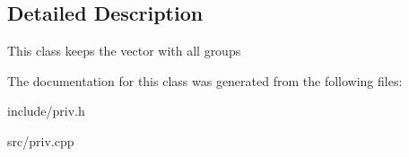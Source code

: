 \subsection{Detailed Description}
This class keeps the vector with all groups 

The documentation for this class was generated from the following files\+:\begin{DoxyCompactItemize}
\item 
include/priv.\+h\item 
src/priv.\+cpp\end{DoxyCompactItemize}
